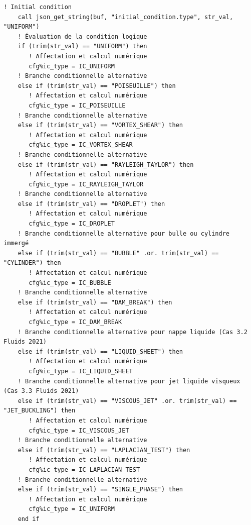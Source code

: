 \documentclass[10pt,a4paper,oneside]{book}
\begin{document}
\begin{lstlisting}[language={[95]Fortran}]
    ! Initial condition
    call json_get_string(buf, "initial_condition.type", str_val, "UNIFORM")
    ! Évaluation de la condition logique
    if (trim(str_val) == "UNIFORM") then
       ! Affectation et calcul numérique
       cfg%ic_type = IC_UNIFORM
    ! Branche conditionnelle alternative
    else if (trim(str_val) == "POISEUILLE") then
       ! Affectation et calcul numérique
       cfg%ic_type = IC_POISEUILLE
    ! Branche conditionnelle alternative
    else if (trim(str_val) == "VORTEX_SHEAR") then
       ! Affectation et calcul numérique
       cfg%ic_type = IC_VORTEX_SHEAR
    ! Branche conditionnelle alternative
    else if (trim(str_val) == "RAYLEIGH_TAYLOR") then
       ! Affectation et calcul numérique
       cfg%ic_type = IC_RAYLEIGH_TAYLOR
    ! Branche conditionnelle alternative
    else if (trim(str_val) == "DROPLET") then
       ! Affectation et calcul numérique
       cfg%ic_type = IC_DROPLET
    ! Branche conditionnelle alternative pour bulle ou cylindre immergé
    else if (trim(str_val) == "BUBBLE" .or. trim(str_val) == "CYLINDER") then
       ! Affectation et calcul numérique
       cfg%ic_type = IC_BUBBLE
    ! Branche conditionnelle alternative
    else if (trim(str_val) == "DAM_BREAK") then
       ! Affectation et calcul numérique
       cfg%ic_type = IC_DAM_BREAK
    ! Branche conditionnelle alternative pour nappe liquide (Cas 3.2 Fluids 2021)
    else if (trim(str_val) == "LIQUID_SHEET") then
       ! Affectation et calcul numérique
       cfg%ic_type = IC_LIQUID_SHEET
    ! Branche conditionnelle alternative pour jet liquide visqueux (Cas 3.3 Fluids 2021)
    else if (trim(str_val) == "VISCOUS_JET" .or. trim(str_val) == "JET_BUCKLING") then
       ! Affectation et calcul numérique
       cfg%ic_type = IC_VISCOUS_JET
    ! Branche conditionnelle alternative
    else if (trim(str_val) == "LAPLACIAN_TEST") then
       ! Affectation et calcul numérique
       cfg%ic_type = IC_LAPLACIAN_TEST
    ! Branche conditionnelle alternative
    else if (trim(str_val) == "SINGLE_PHASE") then
       ! Affectation et calcul numérique
       cfg%ic_type = IC_UNIFORM
    end if


\end{lstlisting}
\end{document}

